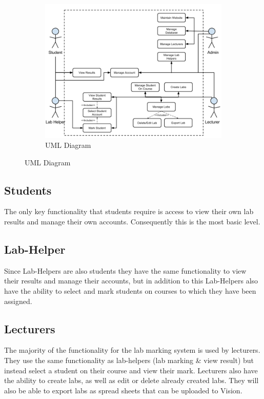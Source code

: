 \documentclass[11pt]{report}
\begin{document}
{

\begin{figure}
\begin{figure}[H]
    \centering
    \includegraphics[width=1
    \textwidth]{images/design/Use-Case-Diagram.png}
    \caption{UML Diagram}
    \label{fig:uml}
\end{figure}
\end{figure}

\subsection*{Students}
The only key functionality that students require is access to view their own lab results and manage their own accounts. Consequently this is the most basic level.


\subsection*{Lab-Helper}
Since Lab-Helpers are also students they have the same functionality to view their results and manage their accounts, but in addition to this Lab-Helpers also have the ability to select and mark students on courses to which they have been assigned.

} 


\subsection*{Lecturers}

The majority of the functionality for the lab marking system is used by lecturers. They use the same functionality as lab-helpers (lab marking \& view result) but instead  select a student on their course and view their mark. Lecturers also have the ability to create labs, as well as edit or delete already created labs. They will also be able to export labs as spread sheets that can be uploaded to Vision.  
\end{document}
